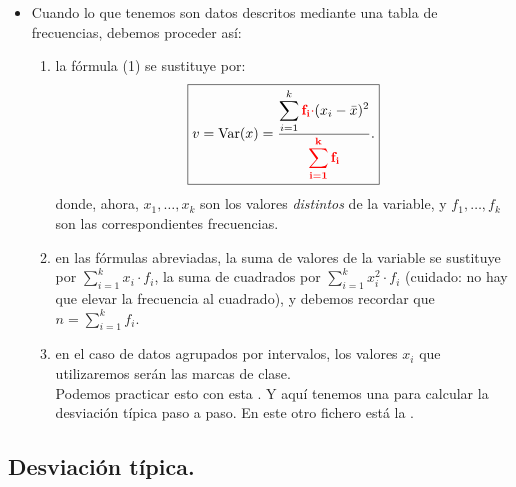 \begin{itemize}
    \item Cuando lo que tenemos son datos descritos mediante una tabla de frecuencias, debemos proceder así:
            \begin{enumerate}
            \item la fórmula (1) se sustituye por:
                 \[\fbox{$v=\mbox{Var($x$)}=\dfrac{\displaystyle\sum_{i=1}^k\textcolor{red}{\bf f_i\cdot}(x_i-\bar x)^2}{\textcolor{red}{\bf \displaystyle\sum_{i=1}^k f_i}}.$}\]
                 donde, ahora, $x_1,\ldots,x_k$ son los valores {\em distintos} de la variable, y $f_1,\ldots,f_k$ son las correspondientes frecuencias.
            \item en las fórmulas abreviadas, la suma de valores de la variable se sustituye por $\sum_{i=1}^kx_i\cdot f_i$, la suma de cuadrados por $\sum_{i=1}^kx_i^2\cdot f_i$ (cuidado: no hay que elevar la frecuencia al cuadrado), y debemos recordar que $n=\sum_{i=1}^k f_i$.
            \item en el caso de datos agrupados por intervalos, los valores $x_i$ que utilizaremos serán las marcas de clase.\\
            Podemos practicar esto con esta  . Y aquí tenemos una  para calcular la desviación típica paso a paso. En este otro fichero está la  .
            \end{enumerate}



\end{itemize}


\subsection{Desviación típica.}

